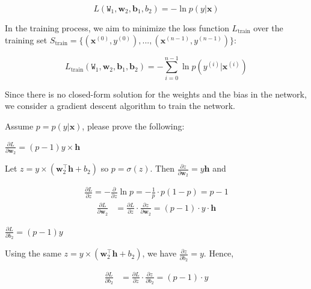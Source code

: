 \documentclass{article}
\newcommand{\x}{\mathbf{x}}
\newcommand{\w}{\mathbf{w}}
\newcommand{\h}{\mathbf{h}}
\newcommand{\W}{\texttt{W}}
\renewcommand{\b}{\mathbf{b}}
\begin{document}
\begin{probset}
\begin{prob}
    \[ L(\W_1, \w_2, \b_1, b_2) = -\ln p(y|\x) \]

    In the training process, we aim to minimize the loss function $L_{\text{train}}$ over the training set \newline $S_{\text{train}} = \{(\x^{(0)}, y^{(0)}), ..., (\x^{(n-1)}, y^{(n-1)})\}$:

    \[ L_{\text{train}}(\W_1, \w_2, \b_1, \b_2) = -\sum_{i=0}^{n-1} \ln p(y^{(i)}|\x^{(i)}) \]

    Since there is no closed-form solution for the weights and the bias in the network, we consider a gradient descent algorithm to train the network. 
    
    Assume $p = p(y|\x)$, please prove the following:

    \newpage

    \begin{subprobset}
    \begin{subprob}
        $\displaystyle\frac{\partial L}{\partial \w_2} = (p - 1) y \times \h$

        \begin{soln}
            Let $z = y \times (\w_2^\top \h + b_2)$ so $p = \sigma(z)$. Then $\frac{\partial z}{\partial \w_2} = y\h$ and
            
            \begin{align*}
                \frac{\partial L}{\partial z} = -
                \frac{\partial}{\partial z} \ln p = -\frac{1}{p} \cdot p (1 - p) = p - 1
            \end{align*}
            \begin{align*}
                \frac{\partial L}{\partial \w_2}
                &= \frac{\partial L}{\partial z} \cdot \frac{\partial z}{\partial \w_2}
                = (p - 1) \cdot y \cdot \h
            \end{align*}
        \end{soln}
    \end{subprob}

    \begin{subprob}
        $\displaystyle\frac{\partial L}{\partial b_2} = (p - 1) y$

        \begin{soln}
            Using the same $z = y \times (\w_2^\top \h + b_2)$, we have $\frac{\partial z}{\partial b_2} = y$. Hence,

            \begin{align*}
                \frac{\partial L}{\partial b_2}
                &= \frac{\partial L}{\partial z} \cdot \frac{\partial z}{\partial b_2}
                = (p - 1) \cdot y
            \end{align*}
        \end{soln}
    \end{subprob}


\end{subprobset}
\end{prob}
\end{probset}
\end{document}
